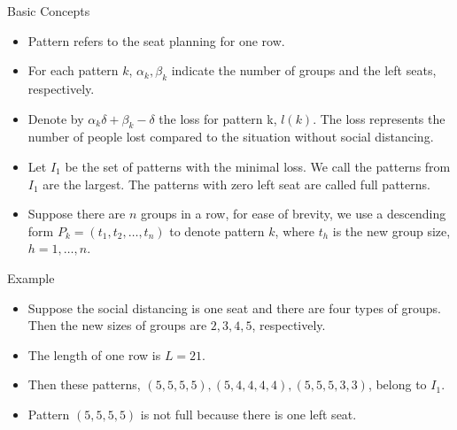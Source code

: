   \begin{frame}{Basic Concepts}
    \begin{itemize}
      \item Pattern refers to the seat planning for one row.
      \item For each pattern $k$, $\alpha_k, \beta_k$ indicate the number of groups and the left seats, respectively.
      \item Denote by $\alpha_k \delta + \beta_k - \delta$ the loss for pattern k, $l(k)$. The loss represents the number of people lost compared to the situation without social distancing.
      \item Let $I_1$ be the set of patterns with the minimal loss. We call the patterns from $I_1$ are the largest. The patterns with zero left seat are called full patterns.
      \item Suppose there are $n$ groups in a row, for ease of brevity, we use a descending form $P_{k} = (t_1, t_2, \ldots, t_n)$ to denote pattern $k$, where $t_h$ is the new group size, $h = 1,\ldots, n$.
    \end{itemize}
  \end{frame}

  \begin{frame}{Example}
    \begin{itemize}
      \item Suppose the social distancing is one seat and there are four types of groups. Then the new sizes of groups are $2, 3, 4, 5$, respectively. 
      \item The length of one row is $L = 21$.
      \item Then these patterns, $(5, 5, 5, 5), (5, 4, 4, 4, 4),(5, 5, 5, 3, 3)$, belong to $I_1$.
      \item Pattern $(5, 5, 5, 5)$ is not full because there is one left seat.
    \end{itemize}
  \end{frame}

